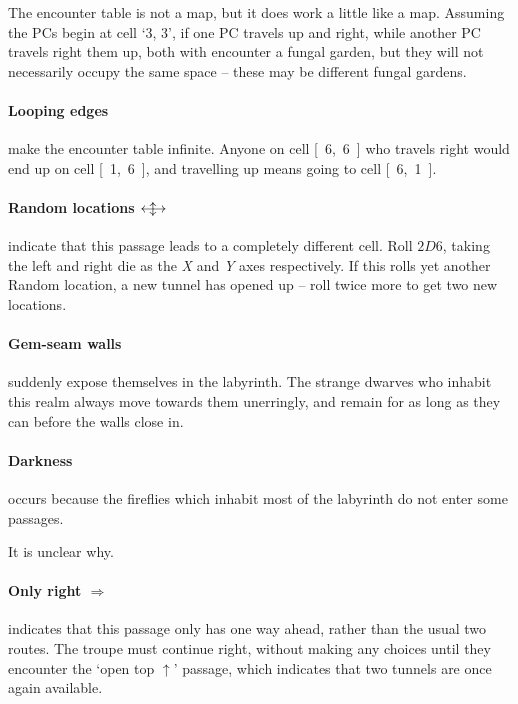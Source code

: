 \begin{multicols}{2}
The encounter table is not a map, but it does work a little like a map.
Assuming the PCs begin at cell `3, 3', if one PC travels up and right, while another PC travels right them up, both with encounter a fungal garden, but they will not necessarily occupy the same space -- these may be different fungal gardens.

\paragraph{Looping edges}
make the encounter table infinite.
Anyone on cell \mbox{[ 6, 6 ]} who travels right would end up on cell \mbox{[ 1, 6 ]}, and travelling up means going to cell \mbox{[ 6, 1 ]}.

\paragraph{Random locations $\longleftrightarrow\hspace{-1.2em}\updownarrow$}
indicate that this passage leads to a completely different cell.
Roll $2D6$, taking the left and right die as the \textit{X} and \textit{Y} axes respectively.
If this rolls yet another Random location, a new tunnel has opened up -- roll twice more to get two new locations.

\paragraph{Gem-seam walls}
suddenly expose themselves in the labyrinth.
The strange dwarves who inhabit this realm always move towards them unerringly, and remain for as long as they can before the walls close in.

\paragraph{Darkness}
occurs because the fireflies which inhabit most of the labyrinth do not enter some passages.

It is unclear why.

\paragraph{Only right $\Rightarrow$}
indicates that this passage only has one way ahead, rather than the usual two routes.
The troupe must continue right, without making any choices until they encounter the `open top $\uparrow$' passage, which indicates that two tunnels are once again available.


\end{multicols}

